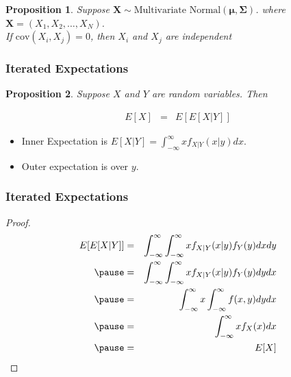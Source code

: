 \documentclass[handout]{beamer}
\newtheorem{prop}{Proposition}
\numberwithin{equation}{section}
\begin{document}
\begin{frame}

\begin{prop}
Suppose $\boldsymbol{X} \sim \text{Multivariate Normal}(\boldsymbol{\mu}, \boldsymbol{\Sigma})$.  
where $\boldsymbol{X}= (X_{1}, X_{2}, \hdots, X_{N})$.  \pause\\
If $\text{cov}(X_{i}, X_{j})  = 0  $, then $X_{i}$ and $X_{j}$ are independent 

\end{prop}



\end{frame}



\begin{frame}
\frametitle{Iterated Expectations}

\begin{prop}
Suppose $X$ and $Y$ are random variables.  Then 

\begin{eqnarray}
E[X] & = & E[E[X|Y]] \nonumber 
\end{eqnarray}




\end{prop}


\begin{itemize}
\item[-] Inner Expectation is $E[X|Y] = \int_{-\infty}^{\infty} x f_{X|Y} (x|y) dx$.  
\item[-] Outer expectation is over $y$.  
\end{itemize}


\end{frame}


\begin{frame}
\frametitle{Iterated Expectations}

\pause 
\begin{proof}
\begin{eqnarray}
E[E[X|Y]] & = & \int_{-\infty}^{\infty}  \int_{-\infty}^{\infty} x f_{X|Y} (x|y) f_{Y}(y) dx dy \nonumber \\ \pause 
&= & \int_{-\infty}^{\infty}  \int_{-\infty}^{\infty} x f_{X|Y} (x|y) f_{Y}(y) dy dx \nonumber \\ \pause 
& = & \int_{-\infty}^{\infty} x \int_{-\infty}^{\infty}  f(x, y) dy dx  \nonumber \\ \pause 
& = & \int_{-\infty}^{\infty}  x f_{X}(x) dx  \nonumber \\ \pause 
& =& E[X] \nonumber 
\end{eqnarray}



\end{proof}



\end{frame}
\end{document}
